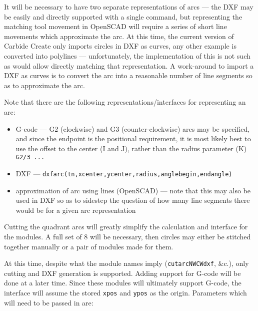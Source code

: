 \documentclass{ltxdoc}
\begin{document}
It will be necessary to have two separate representations of arcs --- the DXF may be easily 
and directly supported with a single command, but representing the matching tool movement
in OpenSCAD will require a series of short line movements which approximate the arc. 
At this time, the current version of Carbide Create only imports circles in DXF as curves,
any other example is converted into polylines --- unfortunately, the implementation of this
is not such as would allow directly matching that representation. A work-around to import
a DXF as curves is to convert the arc into a reasonable number of line segments so as to
approximate the arc.
 
\begin{samepage}
Note that there are the following representations/interfaces for representing an arc:
 
\begin{itemize}
\item G-code --- G2 (clockwise) and G3 (counter-clockwise) arcs may be specified, and since 
      the endpoint is the positional requirement, it is most likely best to use the offset 
      to the center (I and J), rather than the radius parameter (K) \texttt{G2/3 ...} 
\item DXF --- \texttt{dxfarc(tn,xcenter,ycenter,radius,anglebegin,endangle)}
\item approximation of arc using lines (OpenSCAD) --- note that this may also be used 
      in DXF so as to sidestep the question of how many line segments there would be
      for a given arc representation 
\end{itemize}
\end{samepage}
 
Cutting the quadrant arcs will greatly simplify the calculation and interface for the modules.
A full set of 8 will be necessary, then circles may either be stitched together manually or
a pair of modules made for them.
 
At this time, despite what the module names imply (\texttt{cutarcNWCWdxf}, \&c.), only cutting  
and DXF generation is supported. Adding support for G-code will be done at a later time.
Since these modules will ultimately support G-code, the interface will assume the stored
\texttt{xpos} and \texttt{ypos} as the origin. Parameters which will need to be passed in are:
 
\end{document}

